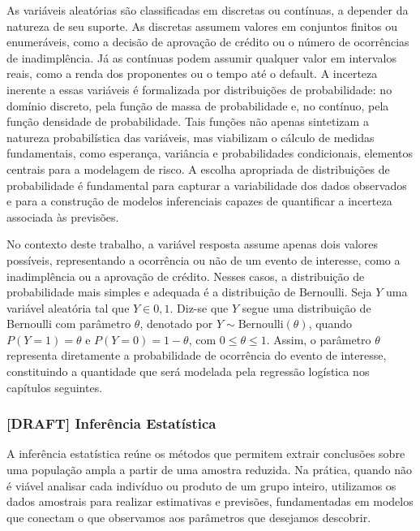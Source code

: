 \documentclass[
  brazilian,
  12pt,
  letterpaper,
  DIV=11,
  numbers=noendperiod]{scrartcl}
\begin{document}
As variáveis aleatórias são classificadas em discretas ou contínuas, a
depender da natureza de seu suporte. As discretas assumem valores em
conjuntos finitos ou enumeráveis, como a decisão de aprovação de crédito
ou o número de ocorrências de inadimplência. Já as contínuas podem
assumir qualquer valor em intervalos reais, como a renda dos proponentes
ou o tempo até o default. A incerteza inerente a essas variáveis é
formalizada por distribuições de probabilidade: no domínio discreto,
pela função de massa de probabilidade e, no contínuo, pela função
densidade de probabilidade. Tais funções não apenas sintetizam a
natureza probabilística das variáveis, mas viabilizam o cálculo de
medidas fundamentais, como esperança, variância e probabilidades
condicionais, elementos centrais para a modelagem de risco. A escolha
apropriada de distribuições de probabilidade é fundamental para capturar
a variabilidade dos dados observados e para a construção de modelos
inferenciais capazes de quantificar a incerteza associada às previsões.

No contexto deste trabalho, a variável resposta assume apenas dois
valores possíveis, representando a ocorrência ou não de um evento de
interesse, como a inadimplência ou a aprovação de crédito. Nesses casos,
a distribuição de probabilidade mais simples e adequada é a distribuição
de Bernoulli. Seja \(Y\) uma variável aleatória tal que \(Y \in {0,1}\).
Diz-se que \(Y\) segue uma distribuição de Bernoulli com parâmetro
\(\theta\), denotado por \(Y \sim \mathrm{Bernoulli}(\theta)\), quando
\(P(Y=1)=\theta\) e \(P(Y=0)=1-\theta\), com \(0 \leq \theta \leq 1\).
Assim, o parâmetro \(\theta\) representa diretamente a probabilidade de
ocorrência do evento de interesse, constituindo a quantidade que será
modelada pela regressão logística nos capítulos seguintes.

\subsubsection{{[}DRAFT{]} Inferência
Estatística}\label{draft-inferuxeancia-estatuxedstica}

A inferência estatística reúne os métodos que permitem extrair
conclusões sobre uma população ampla a partir de uma amostra reduzida.
Na prática, quando não é viável analisar cada indivíduo ou produto de um
grupo inteiro, utilizamos os dados amostrais para realizar estimativas e
previsões, fundamentadas em modelos que conectam o que observamos aos
parâmetros que desejamos descobrir.
\end{document}
